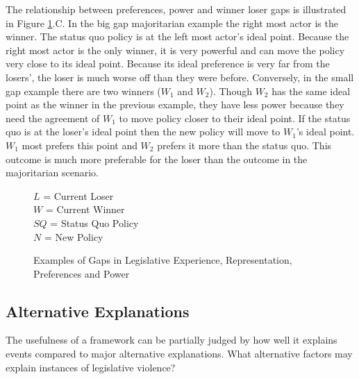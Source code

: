 \documentclass[a4paper]{article}\usepackage{graphicx, color}
\begin{document}
The relationship between preferences, power and winner loser gaps is illustrated in Figure \ref{example_gaps}.C. In the big gap majoritarian example the right most actor is the winner. The status quo policy is at the left most actor's ideal point. Because the right most actor is the only winner, it is very powerful and can move the policy very close to its ideal point. Because its ideal preference is very far from the losers', the loser is much worse off than they were before. Conversely, in the small gap example there are two winners ($W_{1}$ and $W_{2}$). Though $W_{2}$ has the same ideal point as the winner in the previous example, they have less power because they need the agreement of $W_{1}$ to move policy closer to their ideal point. If the status quo is at the loser's ideal point then the new policy will move to $W_{1}$'s ideal point. $W_{1}$ most prefers this point and $W_{2}$ prefers it more than the status quo. This outcome is much more preferable for the loser than the outcome in the majoritarian scenario.

\begin{figure}[h!]
    \caption{Examples of Gaps in Legislative Experience, Representation, Preferences and Power}
    \label{example_gaps}
    \begin{center}

        

    \end{center}
        \begin{singlespace}
        {\scriptsize{$L$ = Current Loser \\
                        $W$ = Current Winner \\
                        $SQ$ = Status Quo Policy \\
                        $N$ = New Policy
                    }}
    \end{singlespace}

\end{figure}


\subsection{Alternative Explanations}

The usefulness of a framework can be partially judged by how well it explains events compared to major alternative explanations. What alternative factors may explain instances of legislative violence?
\end{document}

